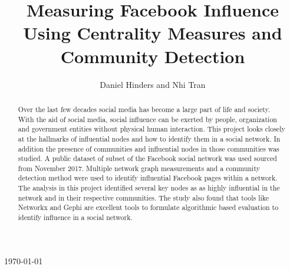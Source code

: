 \documentclass[11pt,twocolumn]{article}
\begin{document}
\begin{titlepage}
    
    
    \vfill\vfill\vfill %
    
    {\large\today} %
    
    
     
    
    \vfill %
    
\end{titlepage}

\title{Measuring Facebook Influence Using Centrality Measures and Community Detection}
\author{Daniel Hinders and Nhi Tran}
\maketitle
\begin{abstract}
Over the last few decades social media has become a large part of life and society. With the aid of social media, social influence can be exerted by people, organization and government entities without physical human interaction. This project looks closely at the hallmarks of influential nodes and how to identify them in a social network. In addition the presence of communities and influential nodes in those communities was studied.  A public dataset of subset of the Facebook social network was used sourced from November 2017. Multiple network graph measurements and a community detection method were used to identify influential Facebook pages within a network. The analysis in this project identified several key nodes as as highly influential in the network and in their respective communities. The study also found that tools like Networkx and Gephi are excellent tools to formulate algorithmic based evaluation to identify influence in a social network.\end{abstract}
\end{document}
